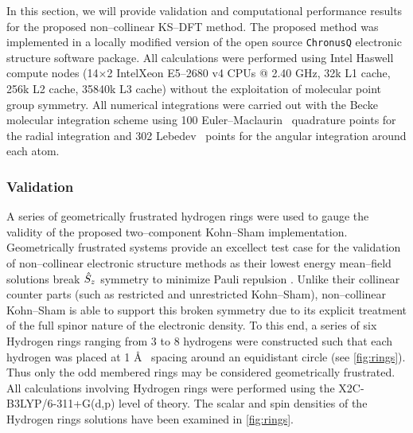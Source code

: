 In this section, we will provide validation and computational performance
results for the proposed non--collinear KS--DFT method. The proposed method was
implemented in a locally modified version of the open source
\texttt{ChronusQ}\cite{chronusq_beta2} electronic structure software package.
All calculations were performed using Intel Haswell compute nodes (14$\times$2
Intel\textregistered Xeon E5--2680 v4 CPUs @ 2.40 GHz, 32k L1 cache, 256k L2
cache, 35840k L3 cache) without the exploitation of molecular point group
symmetry. All numerical integrations were carried out with the Becke molecular
integration scheme using 100 Euler--Maclaurin~\cite{Laming93_997} quadrature points for the
radial integration and 302 Lebedev~\cite{Lebedev77_99} points for the angular integration around
each atom.

\subsubsection{Validation}
\label{sec:NCDFT_VALID}

A series of geometrically frustrated hydrogen rings were used to gauge the validity of the 
proposed two--component Kohn--Sham implementation. Geometrically frustrated systems
provide an excellect test case for the validation of non--collinear electronic structure
methods as their lowest energy mean--field solutions break $\hat{S}_z$ symmetry to minimize
Pauli repulsion \cite{Gross07_196405,Frisch07_125119,Frisch12_2193,Scuseria13_035117,Yamaguchi01_670,Blochl03_15772,Truhlar11_2629,Truhlar13_5349,Li15_154109} .
Unlike their collinear counter parts (such as restricted and unrestricted Kohn--Sham), non--collinear
Kohn--Sham is able to support this broken symmetry due to its explicit treatment of the full
spinor nature of the electronic density. To this end, a series of six Hydrogen rings ranging from 3 to
8 hydrogens were constructed such that each hydrogen was placed at 1 \AA~ spacing around 
an equidistant circle (see \cref{fig:rings}). Thus only the odd membered rings may be considered geometrically
frustrated. All calculations involving Hydrogen rings were performed using the X2C-B3LYP/6-311+G(d,p)
level of theory\cite{Becke93_5648,Parr88_785,Preuss89_200}. 
The scalar and spin densities of the Hydrogen rings solutions have been examined in \cref{fig:rings}. 


